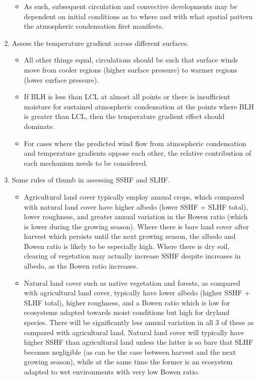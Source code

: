 \begin{enumerate}
\begin{itemize}
		\item As such, subsequent circulation and convective developments may be dependent on initial conditions as to where and with what spatial pattern the atmospheric condensation first manifests.
	\end{itemize}
	\item Assess the temperature gradient across different surfaces.
	\begin{itemize}
		\item All other things equal, circulations should be such that surface winds move from cooler regions (higher surface pressure) to warmer regions (lower surface pressure).
		\item If \ac{BLH} is less than \ac{LCL} at almost all points or there is insufficient moisture for sustained atmospheric condensation at the points where \ac{BLH} is greater than \ac{LCL}, then the temperature gradient effect should dominate.
		\item For cases where the predicted wind flow from atmospheric condensation and temperature gradients oppose each other, the relative contribution of each mechanism needs to be considered.
	\end{itemize}
	\item Some rules of thumb in assessing \ac{SSHF} and \ac{SLHF}.
	\begin{itemize}
		\item Agricultural land cover typically employ annual crops, which compared with natural land cover have higher albedo (lower \ac{SSHF} + \ac{SLHF} total), lower roughness, and greater annual variation in the Bowen ratio (which is lower during the growing season). Where there is bare land cover after harvest which persists until the next growing season, the albedo and Bowen ratio is likely to be especially high. Where there is dry soil, clearing of vegetation may actually increase \ac{SSHF} despite increases in albedo, as the Bowen ratio increases.
		\item Natural land cover such as native vegetation and forests, as compared with agricultural land cover, typically have lower albedo (higher \ac{SSHF} + \ac{SLHF} total), higher roughness, and a Bowen ratio which is low for ecosystems adapted towards moist conditions but high for dryland species. There will be significantly less annual variation in all 3 of these as compared with agricultural land. Natural land cover will typically have higher \ac{SSHF} than agricultural land unless the latter is so bare that \ac{SLHF} becomes negligible (as can be the case between harvest and the next growing season), while at the same time the former is an ecosystem adapted to wet environments with very low Bowen ratio. 

\end{itemize}
\end{enumerate}
